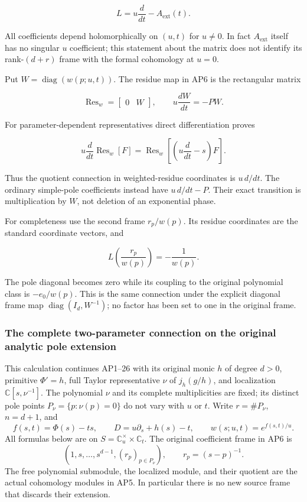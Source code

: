 \[
L=u\frac{d}{dt}-A_{\mathrm{ext}}(t).
\tag{AP10}
\]

All coefficients depend holomorphically on \((u,t)\) for \(u\ne0\). In fact \(A_{\mathrm{ext}}\) itself has no singular \(u\) coefficient; this statement about the matrix does not identify its rank-\((d+r)\) frame with the formal cohomology at \(u=0\).

Put \(W=\operatorname{diag}(w(p;u,t))\). The residue map in AP6 is the rectangular matrix

\[
\operatorname{Res}_w=\begin{bmatrix}0&W\end{bmatrix},\qquad
u\frac{dW}{dt}=-P W.
\tag{AP11}
\]

For parameter-dependent representatives direct differentiation proves

\[
u\frac{d}{dt}\operatorname{Res}_w[F]
=\operatorname{Res}_w\left[\left(u\frac{d}{dt}-s\right)F\right].
\tag{AP12}
\]

Thus the quotient connection in weighted-residue coordinates is \(u\,d/dt\). The ordinary simple-pole coefficients instead have \(u\,d/dt-P\). Their exact transition is multiplication by \(W\), not deletion of an exponential phase.

For completeness use the second frame \(r_p/w(p)\). Its residue coordinates are the standard coordinate vectors, and

\[
L\left(\frac{r_p}{w(p)}\right)=-\frac{1}{w(p)}.
\tag{AP13}
\]

The pole diagonal becomes zero while its coupling to the original polynomial class is \(-e_0/w(p)\). This is the same connection under the explicit diagonal frame map \(\operatorname{diag}(I_d,W^{-1})\); no factor has been set to one in the original frame.

\subsubsection{The complete two-parameter connection on the original analytic pole extension}
\label{sec:apu-original-connection}

This calculation continues AP1--26 with its original monic \(h\) of
degree \(d>0\), primitive \(\Phi'=h\), full Taylor representative
\(\nu\) of \(j_h(g/h)\), and localization
\(\mathbb C[s,\nu^{-1}]\).  The polynomial \(\nu\) and its complete
multiplicities are fixed; its distinct pole points
\(P_\nu=\{p:\nu(p)=0\}\) do not vary with \(u\) or \(t\).
Write \(r=\#P_\nu\), \(n=d+1\), and
\[
 f(s,t)=\Phi(s)-ts,\qquad
 D=u\partial_s+h(s)-t,\qquad
 w(s;u,t)=e^{f(s,t)/u}.
 \tag{APU1}
\]
All formulas below are on
\(S=\mathbb C^\times_u\times\mathbb C_t\).
The original coefficient frame in AP6 is
\[
 (1,s,\ldots,s^{d-1},(r_p)_{p\in P_\nu}),\qquad
 r_p=(s-p)^{-1}.
 \tag{APU2}
\]
The free polynomial submodule, the localized module, and their
quotient are the actual cohomology modules in AP5.  In particular
there is no new source frame that discards their extension.

